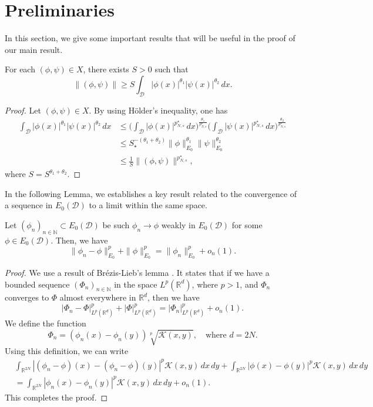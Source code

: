 \documentclass[reqno]{amsart}
\begin{document}
\section{Preliminaries}

In this section, we give some important results that will be useful in the proof of 
our main result.

\begin{lemma} 
For each $(\phi,\psi)\in X$, there exists $S>0$ such that
\begin{equation}\label{S}
\| (\phi,\psi)\|\geq S \int_\mathcal{D}
|\phi(x)|^{\theta_1}|\psi(x)|^{\theta_2}\,dx.
\end{equation}
\end{lemma}

\begin{proof}
Let $(\phi,\psi)\in X$. By using  H\"older's inequality, one has
\begin{align*}
\int_\mathcal{D} |\phi(x)|^{\theta_1}|\psi(x)|^{\theta_2}\,dx
&\leq  \Big(\int_\mathcal{D}|\phi(x)|^{p^\star_{N,s}}\,dx
 \Big)^\frac{\theta_1}{p^\star_{N,s}}\Big(\int_\mathcal{D}|\psi(x)|^{p^\star_{N,s}}\,dx\Big)^\frac{\theta_2}{p^\star_{N,s}} \\
&\leq S_\star^{-(\theta_1+\theta_2)}\| \phi\|_{E_0}^{\theta_1}
 \| \psi\|_{E_0}^{\theta_2}\\
&\leq  \frac{1}{S}\| (\phi,\psi)\|^{p^\star_{N,s}},
\end{align*}
where $S=S^{\theta_1+\theta_2}$.
\end{proof}

In the following Lemma, we establishes a key result related to the convergence of 
a sequence in $E_0(\mathcal{D})$ to a limit within the same space.

\begin{lemma}\label{l1}
Let $(\phi_n)_{n\in\mathbb{N}}\subset E_0(\mathcal{D})$ be such $\phi_n\to \phi$
weakly in $E_0(\mathcal{D})$ for some $\phi\in E_0(\mathcal{D})$. 
Then, we have
\[
\| \phi_n-\phi\|_{E_0}^p+\| \phi\|_{E_0}^p
=\| \phi_n\|_{E_0}^p+o_n(1).
\]
\end{lemma}

\begin{proof}
We use a result of Br\'ezis-Lieb's lemma \cite{bb}. 
It states that if we have a bounded sequence $(\Phi_n)_{n\in\mathbb{N}}$ in the space 
$L^p(\mathbb{R}^d)$, where $p>1$, and $\Phi_n$ converges to $\Phi$ almost everywhere 
in $\mathbb{R}^d$, then we have
\[
|\Phi_n-\Phi|_{L^p(\mathbb{R}^d)}^p+|\Phi|_{L^p(\mathbb{R}^d)}^p
=|\Phi_n|_{L^p(\mathbb{R}^d)}^p+o_n(1).
\]
We define the function 
\[
\Phi_n=(\phi_n(x)-\phi_n(y))\sqrt[p]{\mathcal{K}(x,y)}, \quad \text{where } d=2N.
\]
Using this definition, we can write 
\begin{align*}
&\int_{\mathbb{R}^{2N}}|(\phi_n-\phi)(x)-(\phi_n-\phi)(y)|^p\mathcal{K}(x,y)
\,dx\,dy+\int_{\mathbb{R}^{2N}}|\phi(x)-\phi(y)|^p\mathcal{K}(x,y)\,dx\,dy \\
&=\int_{\mathbb{R}^{2N}}|\phi_n(x)-\phi_n(y)|^p\mathcal{K}(x,y)\,dx\,dy+o_n(1).
\end{align*}
This completes the proof.
\end{proof}
\end{document}
